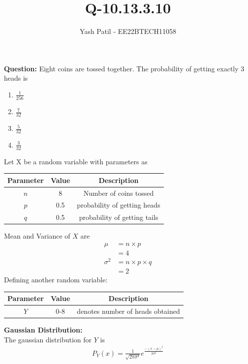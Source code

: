 \documentclass[journal,12pt,twocolumn]{IEEEtran}
\theoremstyle{remark}
\begin{document}



\vspace{3cm}

\title{
Q-10.13.3.10
}
\author{Yash Patil - EE22BTECH11058}

\maketitle
\textbf{Question:} Eight coins are tossed together. The probability of getting exactly 3 heads is
\begin{enumerate}
	\item $\frac{1}{256}$
	\item $\frac{7}{32}$
	\item $\frac{5}{32}$
	\item $\frac{3}{32}$
\end{enumerate}
\solution
Let X be a random variable with parameters as
\begin{table}[H]
\def\arraystretch{1.2}
\begin{tabular}{|c|c|c|}
\hline
	\textbf{Parameter} &\textbf{Value} &\textbf{Description}\\ \hline
	$n$ &8 &Number of coins tossed\\ 
	\hline
	$p$ &0.5 & probability of getting heads\\ 
	\hline
	$q$ &0.5 & probability of getting tails\\ 
	\hline
\end{tabular}
\end{table}
Mean and Variance of $X$ are
\begin{align}
	\mu &= n\times p\\
	&= 4\\
	\sigma^2 &= n\times p \times q\\
	&= 2
\end{align}
Defining another random variable:
\begin{table}[H]
	\begin{tabular}{|c|c|c|}
		\hline
		\textbf{Parameter} &\textbf{Value} &\textbf{Description}\\ 
		\hline
		$Y$ & 0-8 & denotes number of heads obtained\\
		\hline
	\end{tabular}
\end{table}
\textbf{Gaussian Distribution:}\\
The gaussian distribution for $Y$ is
\begin{align}
	P_Y(x) = \frac{1}{\sqrt{2\pi\sigma^2}}e^{\frac{-(x-\mu)^2}{2\sigma^2}}
\end{align}
\end{document}
